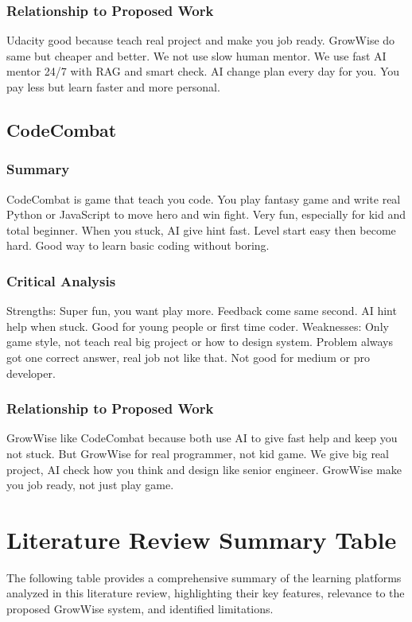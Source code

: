 \documentclass{FastFyp}
\begin{document}
\subsubsection{Relationship to Proposed Work}
Udacity good because teach real project and make you job ready. GrowWise do same but cheaper and better. We not use slow human mentor. We use fast AI mentor 24/7 with RAG and smart check. AI change plan every day for you. You pay less but learn faster and more personal.

\subsection{CodeCombat}

\subsubsection{Summary}
CodeCombat \cite{codecombat2023} is game that teach you code. You play fantasy game and write real Python or JavaScript to move hero and win fight. Very fun, especially for kid and total beginner. When you stuck, AI give hint fast. Level start easy then become hard. Good way to learn basic coding without boring.

\subsubsection{Critical Analysis}
Strengths: Super fun, you want play more. Feedback come same second. AI hint help when stuck. Good for young people or first time coder.  
Weaknesses: Only game style, not teach real big project or how to design system. Problem always got one correct answer, real job not like that. Not good for medium or pro developer.

\subsubsection{Relationship to Proposed Work}
GrowWise like CodeCombat because both use AI to give fast help and keep you not stuck. But GrowWise for real programmer, not kid game. We give big real project, AI check how you think and design like senior engineer. GrowWise make you job ready, not just play game.

\section{Literature Review Summary Table}
The following table provides a comprehensive summary of the learning platforms analyzed in this literature review, highlighting their key features, relevance to the proposed GrowWise system, and identified limitations.
\end{document}
